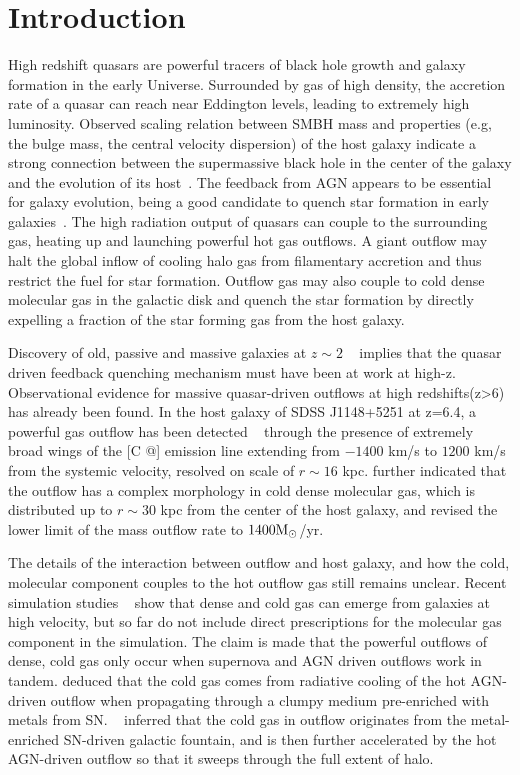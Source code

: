\documentclass[a4paper,usenatbib]{mnras}
\makeatletter
\newcommand{\Rmnum}[1]{\expandafter\@slowromancap\romannumeral #1@}
\makeatother
\begin{document}
\section{Introduction}
High redshift quasars are powerful tracers of black hole growth and galaxy formation in the early Universe. 
Surrounded by gas of high density, the accretion rate of a quasar can reach near Eddington levels, leading to extremely high luminosity. 
Observed scaling relation between SMBH mass and properties (e.g, the bulge mass, the central velocity dispersion) of the host galaxy indicate a strong connection between the supermassive black hole in the center of the galaxy and the evolution of its host~\citep{Silk1998,Kormendy}. 
The feedback from AGN appears to be essential for galaxy evolution, being a good candidate to quench star formation in early galaxies~\citep{Fabian2012,Cheung}. 
The high radiation output of quasars can couple to the surrounding gas, heating up and launching powerful hot gas outflows. 
A giant outflow may halt the global inflow of cooling halo gas from filamentary accretion and thus restrict the fuel for star formation. 
Outflow gas may also couple to cold dense molecular gas in the galactic disk and quench the star formation by directly expelling a fraction of the star forming gas from the host galaxy. 

Discovery of old, passive and massive galaxies at $z\sim2$ ~\citep[e.g.][]{Cimatti2004, Saracco2005} implies that the quasar driven feedback quenching mechanism must have been at work at high-z. 
Observational evidence for massive quasar-driven outflows at high redshifts(z>6) has already been found. 
In the host galaxy of SDSS J1148+5251 at z=6.4, a powerful gas outflow has been detected ~\citep{Maiolino} through the presence of extremely broad wings of the [C \Rmnum{2}] emission line extending from $-1400$ km/s to $1200$ km/s from the systemic velocity, resolved on scale of $r \sim 16$ kpc.
\cite{Cicone2015} further indicated that the outflow has a complex morphology in cold dense molecular gas, which is distributed up to $r \sim 30$ kpc from the center of the host galaxy, and revised the lower limit of the mass outflow rate to $1400 \rm{M}_{\odot}$/yr. 

The details of the interaction between outflow and host galaxy, and how the cold, molecular component couples to the hot outflow gas still remains unclear. 
Recent simulation studies ~\citep[e.g.][]{Costa, Curtis, Biernacki, Barai2018} show that dense and cold gas can emerge from galaxies at high velocity, but so far do not include direct prescriptions for the molecular
gas component in the simulation.
The claim is made that the powerful outflows of dense, cold gas only occur when supernova and AGN driven outflows work in tandem. \cite{Costa} deduced that the cold gas comes from radiative cooling of the hot AGN-driven outflow when propagating through a clumpy medium pre-enriched with metals from SN. ~\cite{Biernacki} inferred that the cold gas in outflow originates from the metal-enriched SN-driven galactic fountain, and is then further accelerated by the hot AGN-driven outflow so that it sweeps through the full extent of halo.
\end{document}
